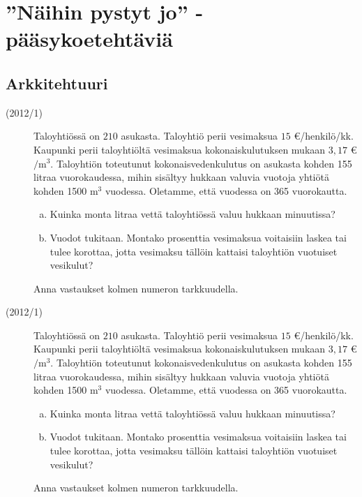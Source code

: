 \chapter{''Näihin pystyt jo'' -pääsykoetehtäviä}

\section{Arkkitehtuuri}

\begin{description}
    \item[(2012/1)] Taloyhtiössä on $210$ asukasta. Taloyhtiö perii vesimaksua
        $15$ \euro/henkilö/kk. Kaupunki perii taloyhtiöltä vesimaksua
        kokonaiskulutuksen mukaan $3,17$ \euro $/ \mathrm{m}^3$.
        Taloyhtiön toteutunut kokonaisvedenkulutus on asukasta kohden
        155 litraa vuorokaudessa, mihin sisältyy hukkaan valuvia
        vuotoja yhtiötä kohden 1500 $\mathrm{m}^3$ vuodessa. Oletamme,
        että vuodessa on 365 vuorokautta.
                    
    \begin{enumerate}[(a)]
        \item Kuinka monta litraa vettä taloyhtiössä valuu hukkaan minuutissa?
        \item Vuodot tukitaan. Montako prosenttia vesimaksua voitaisiin laskea
            tai tulee korottaa, jotta vesimaksu tällöin kattaisi taloyhtiön
            vuotuiset vesikulut?
    \end{enumerate}
    
    Anna vastaukset kolmen numeron tarkkuudella.
\end{description}


\begin{description}
    \item[(2012/1)] Taloyhtiössä on $210$ asukasta. Taloyhtiö perii vesimaksua
        $15$ \euro/henkilö/kk. Kaupunki perii taloyhtiöltä vesimaksua
        kokonaiskulutuksen mukaan $3,17$ \euro $/ \mathrm{m}^3$.
        Taloyhtiön toteutunut kokonaisvedenkulutus on asukasta kohden
        155 litraa vuorokaudessa, mihin sisältyy hukkaan valuvia
        vuotoja yhtiötä kohden 1500 $\mathrm{m}^3$ vuodessa. Oletamme,
        että vuodessa on 365 vuorokautta.
                    
    \begin{enumerate}[(a)]
        \item Kuinka monta litraa vettä taloyhtiössä valuu hukkaan minuutissa?
        \item Vuodot tukitaan. Montako prosenttia vesimaksua voitaisiin laskea
            tai tulee korottaa, jotta vesimaksu tällöin kattaisi taloyhtiön
            vuotuiset vesikulut?
    \end{enumerate}
    
    Anna vastaukset kolmen numeron tarkkuudella.
\end{description}

